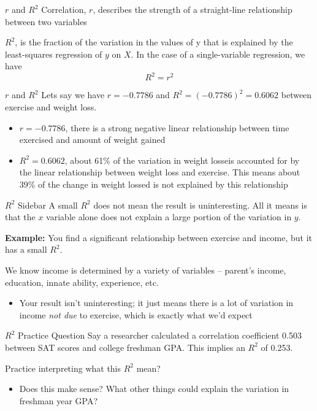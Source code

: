 \documentclass[aspectratio=169,t,11pt,table]{beamer}
\begin{document}


\begin{frame}{$r$ and $R^2$}
  Correlation, $r$, describes the strength of a straight-line relationship between two variables

  \bigskip
  $R^2$, is the fraction of the variation in the values of y that is explained by the least-squares regression of $y$ on $X$. In the case of a single-variable regression, we have 
  $$
    R^2 = r^2
  $$
\end{frame}

\begin{frame}{$r$ and $R^2$}
  Lets say we have $r = -0.7786$ and $R^2 = (-0.7786)^2 = 0.6062$ between exercise and weight loss. 
  
  \begin{itemize}
    \item $r = -0.7786$, there is a strong negative linear relationship between time exercised and amount of weight gained
    
    \item $R^2 = 0.6062$, about 61\% of the variation in weight losseis accounted for by the linear relationship between weight loss and exercise. This means about 39\% of the change in weight lossed is not explained by this relationship
  \end{itemize}
\end{frame}

\begin{frame}{$R^2$ Sidebar}
  A small $R^2$ does not mean the result is uninteresting. All it means is that the $x$ variable alone does not explain a large portion of the variation in $y$.
  
  \pause
  \bigskip  
  \textbf{Example:} You find a significant relationship between exercise and income, but it has a small $R^2$. 
  
  \medskip
  We know income is determined by a variety of variables -- parent's income, education, innate ability, experience, etc. 
  
  \begin{itemize}
    \item Your result isn't uninteresting; it just means there is a lot of variation in income \emph{not due} to exercise, which is exactly what we'd expect
  \end{itemize}
\end{frame}

\begin{frame}{$R^2$ Practice Question}
  Say a researcher calculated a correlation coefficient 0.503 between SAT scores and college freshman GPA. This implies an $R^2$ of 0.253. 
  
  \bigskip
  Practice interpreting what this $R^2$ mean? 
  \begin{itemize}
    \item Does this make sense? What other things could explain the variation in freshman year GPA?
  \end{itemize}
\end{frame}
\end{document}
